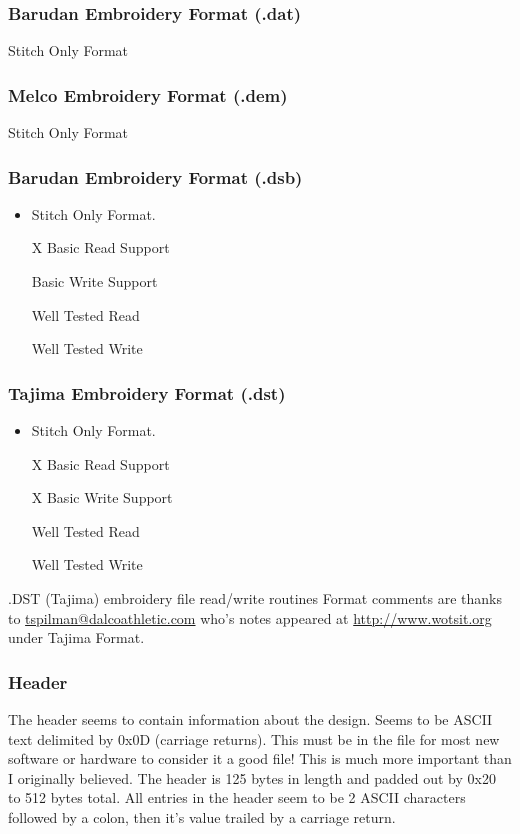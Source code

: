 \documentclass[a4paper, 11pt]{report}
\begin{document}
\subsubsection{Barudan Embroidery Format (.dat)}

Stitch Only Format

\subsubsection{Melco Embroidery Format (.dem)}

Stitch Only Format

\subsubsection{Barudan Embroidery Format (.dsb)}

\begin{itemize}
\item Stitch Only Format.
\item [X] Basic Read Support
\item [ ] Basic Write Support
\item [ ] Well Tested Read
\item [ ] Well Tested Write
\end{itemize}

\subsubsection{Tajima Embroidery Format (.dst)}

\begin{itemize}
\item Stitch Only Format.
\item [X] Basic Read Support
\item [X] Basic Write Support
\item [ ] Well Tested Read
\item [ ] Well Tested Write
\end{itemize}

.DST (Tajima) embroidery file read/write routines
Format comments are thanks to \url{tspilman@dalcoathletic.com} who's
notes appeared at \url{http://www.wotsit.org} under Tajima Format.

\subsubsection{Header}

The header seems to contain information about the design.
Seems to be ASCII text delimited by 0x0D (carriage returns).
This must be in the file for most new software or hardware
to consider it a good file! This is much more important
than I originally believed. The header is 125 bytes in
length and padded out by 0x20 to 512 bytes total.
All entries in the header seem to be 2 ASCII characters
followed by a colon, then it's value trailed by a carriage return.
\end{document}
